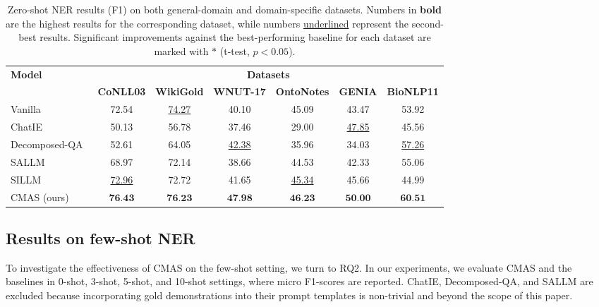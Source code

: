 \begin{table*}[t]
  \centering
  \setlength\tabcolsep{3.5pt}
  \caption{Zero-shot NER results (F1) on both general-domain and domain-specific datasets. Numbers in \textbf{bold} are the highest results for the corresponding dataset, while numbers \underline{underlined} represent the second-best results. Significant improvements against the best-performing baseline for each dataset are marked with $\ast$ (t-test, $p < 0.05$). }
  \label{tab:zero-shot NER-chapter5}
  \begin{tabular}{l cccccc}
    \toprule
  \multirow{2}{*}{\bf Model} & \multicolumn{6}{c}{\bf Datasets}\\
    \cmidrule(r){2-7}
     & \bf CoNLL03 & \bf WikiGold & \bf WNUT-17 & \bf OntoNotes & \bf GENIA & \bf BioNLP11 \\
  \midrule
    Vanilla~\citep{DBLP:conf/emnlp/XieLZZLW23,DBLP:journals/corr/abs-2311-08921}  & 72.54 & \underline{74.27}  & 40.10 & 45.09  & 43.47  & 53.92 \\
    ChatIE~\citep{wei2023zero}  & 50.13 & 56.78  & 37.46
 & 29.00  & \underline{47.85}  & 45.56  \\
    Decomposed-QA~\citep{DBLP:conf/emnlp/XieLZZLW23}  & 52.61 & 64.05  & \underline{42.38}
 & 35.96  & 34.03  & \underline{57.26}  \\
 SALLM~\citep{DBLP:conf/emnlp/XieLZZLW23} & 68.97 & 72.14 & 38.66 & 44.53 & 42.33  & 55.06  \\
  SILLM~\citep{DBLP:journals/corr/abs-2311-08921}& \underline{72.96} & 72.72 & 41.65 & \underline{45.34} & 45.66 & 44.99  \\
    \midrule
    CMAS (ours) &$\textbf{76.43}$\rlap{$^{\ast}$} & $\textbf{76.23}$\rlap{$^{\ast}$} & $\textbf{47.98}$\rlap{$^{\ast}$} & $\textbf{46.23}$\rlap{$^{\ast}$} & $\textbf{50.00}$\rlap{$^{\ast}$} & $\textbf{60.51}$\rlap{$^{\ast}$} \\ 
  \bottomrule
\end{tabular}
\end{table*}

\subsection{Results on few-shot NER}
\label{subsec:few-shot results-chapter5}
To investigate the effectiveness of \ac{CMAS} on the few-shot setting, we turn to RQ2. In our experiments, we evaluate \ac{CMAS} and the baselines in 0-shot, 3-shot, 5-shot, and 10-shot settings, where micro F1-scores are reported. ChatIE, Decomposed-QA, and SALLM are excluded because incorporating gold demonstrations into their prompt templates is non-trivial and beyond the scope of this paper.

